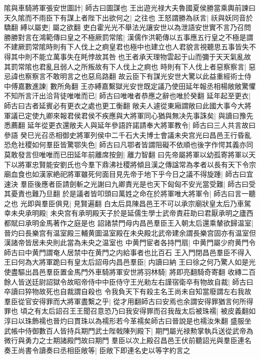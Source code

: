 隂與車騎將軍張安世圖計|{
	師古曰圖謀也}
王出遊光禄大夫魯國夏侯勝當乘輿前諫曰天久隂而不雨臣下有謀上者陛下出欲何之|{
	之往也}
王怒謂勝為祅言|{
	祅與妖同音於驕翻}
縛以屬吏|{
	屬之欲翻}
吏白霍光光不舉法光讓安世以為泄語安世實不言乃召問勝勝對言在鴻範傳曰皇之不極厥罰常隂|{
	漢儒作洪範傳以五事應五行皇之不極是謂不建厥罰常隂時則有下人伐上之痾皇君也極中也建立也人君貌言視聽思五事皆失不得其中則不能立萬事失在眊悖故其咎也王者承天理物雲起于山而彌于天天氣亂故其罰常隂也君亂且弱人之所叛故有下人伐上之痾也}
時則有下人伐上者惡察察言|{
	惡忌諱也察察言不敢明言之也惡烏路翻}
故云臣下有謀光安世大驚以此益重經術士侍中傅嘉數進諫|{
	數所角翻}
王亦縛嘉繫獄光安世既定議乃使田延年報丞相楊敞敞驚懼不知所言汗出洽背徒唯唯而已|{
	師古曰唯唯者恭應之辭也唯於癸翻}
延年起至更衣|{
	師古曰古者延賓必有更衣之處也更工衡翻}
敞夫人遽從東廂謂敞曰此國大事今大將軍議已定使九卿來報君侯君侯不疾應與大將軍同心猶與無决先事誅矣|{
	與讀曰豫先悉薦翻}
延年從更衣還敞夫人與延年參語許諾請奉大將軍教令|{
	師古曰三人共言故曰參語}
癸巳光召丞相御史將軍列侯中二千石大夫博士會議未央宫光曰昌邑王行昏亂恐危社稷如何羣臣皆驚鄂失色|{
	師古曰凡鄂者皆謂阻礙不依順也後字作愕其義亦同}
莫敢發言但唯唯而已田延年前離席按劍|{
	離力智翻}
曰先帝屬將軍以幼孤寄將軍以天下以將軍忠賢能安劉氏也今羣下鼎沸社稷將傾且漢之傳諡常為孝者以長有天下令宗廟血食也如漢家絶祀將軍雖死何面目見先帝于地下乎今日之議不得旋踵|{
	師古曰宜速決}
羣臣後應者臣請劍斬之光謝曰九卿責光是也天下匈匈不安光當受難|{
	師古曰受其憂責也難乃旦翻}
於是議者皆叩頭曰萬姓之命在於將軍唯大將軍令|{
	師古曰言一聽之也}
光即與羣臣俱見|{
	見賢遍翻}
白太后具陳昌邑王不可以承宗廟狀皇太后乃車駕幸未央承明殿|{
	未央宫有承明殿天子於是延儒生學士武帝責莊助曰君厭承明之廬西都賦曰承明金馬著作之庭是也}
詔諸禁門母内昌邑羣臣王入朝太后還乘輦欲歸温室|{
	晉灼曰長樂宫有温室殿三輔黄圖温室殿在未央殿北武帝建余謂長樂宫固亦有温室但漢諸帝皆居未央則此當為未央之温室也}
中黄門宦者各持門扇|{
	中黄門屬少府黄門令師古曰中黄門謂奄人居禁中在黄門之内給事者也比百石}
王入門閉昌邑羣臣不得入王曰何為大將軍跪曰有皇太后詔毋内昌邑羣臣|{
	内讀曰納}
王曰徐之何乃驚人如是光使盡驅出昌邑羣臣置金馬門外車騎將軍安世將羽林騎|{
	將即亮翻騎奇寄翻}
收縳二百餘人皆送廷尉詔獄令故昭帝侍中中臣侍守王光勑左右謹宿衛卒有物故自裁|{
	師古曰卒讀曰猝物故死也自裁謂自殺也}
令我負天下有殺主名王尚未自知當廢謂左右我故羣臣從官安得罪而大將軍盡繫之乎|{
	從才用翻師古曰安焉也余謂安得罪猶言何所得罪也}
頃之有太后詔召王王聞召意恐乃曰我安得罪而召我哉太后被珠襦|{
	被皮義翻如淳曰以珠飾襦也晉灼曰貫珠以為襦形若今革襦矣師古曰晉說是也襦汝朱翻}
盛服坐武帳中侍御數百人皆持兵期門武士陛戟陳列殿下|{
	期門屬光禄勲掌執兵送從武帝為微行與勇力之士期諸殿門故曰期門}
羣臣以次上殿召昌邑王伏前聽詔光與羣臣連名奏王尚書令讀奏曰丞相臣敞等|{
	臣敞下即連名史以等字約言之}
